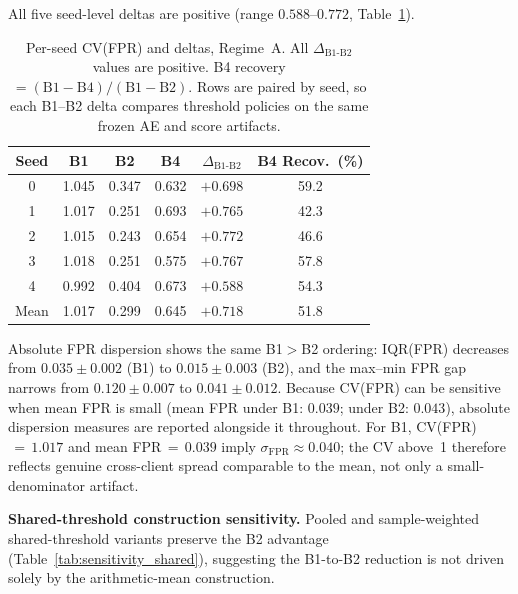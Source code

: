 All five seed-level deltas are positive (range $0.588$--$0.772$, Table~\ref{tab:per_seed}).

\begin{table}[t]
  \caption{Per-seed CV(FPR) and deltas, Regime~A.
           All $\Delta_{\text{B1-B2}}$ values are positive.
           B4 recovery $= (\text{B1} - \text{B4}) / (\text{B1} - \text{B2})$.
           Rows are paired by seed, so each B1--B2 delta compares threshold policies on the same frozen AE and score artifacts.}
  \label{tab:per_seed}
  \centering
  \footnotesize
  \renewcommand{\arraystretch}{1.2}%
  \setlength{\tabcolsep}{4pt}%
  \begin{tabular}{cccccc}
    \toprule
    Seed & B1 & B2 & B4 & $\Delta_{\text{B1-B2}}$ & B4 Recov.\ (\%) \\
    \midrule
    0 & 1.045 & 0.347 & 0.632 & $+0.698$ & 59.2 \\
    1 & 1.017 & 0.251 & 0.693 & $+0.765$ & 42.3 \\
    2 & 1.015 & 0.243 & 0.654 & $+0.772$ & 46.6 \\
    3 & 1.018 & 0.251 & 0.575 & $+0.767$ & 57.8 \\
    4 & 0.992 & 0.404 & 0.673 & $+0.588$ & 54.3 \\
    \midrule
    Mean & 1.017 & 0.299 & 0.645 & $+0.718$ & 51.8 \\
    \bottomrule
  \end{tabular}
\end{table}

Absolute FPR dispersion shows the same B1$>$B2 ordering:
IQR(FPR) decreases from $0.035\pm0.002$ (B1) to $0.015\pm0.003$ (B2),
and the max--min FPR gap narrows from $0.120\pm0.007$ to $0.041\pm0.012$.
Because CV(FPR) can be sensitive when mean FPR is small (mean FPR under B1: $0.039$;
under B2: $0.043$), absolute dispersion measures are reported alongside it throughout.
For B1, CV(FPR)$\,{=}\,1.017$ and mean FPR$\,{=}\,0.039$ imply $\sigma_{\text{FPR}} \approx 0.040$;
the CV above~1 therefore reflects genuine cross-client spread comparable to the mean,
not only a small-denominator artifact.

\textbf{Shared-threshold construction sensitivity.}
Pooled and sample-weighted shared-threshold variants preserve the B2 advantage
(Table~\ref{tab:sensitivity_shared}), suggesting the B1-to-B2 reduction is not
driven solely by the arithmetic-mean construction.

